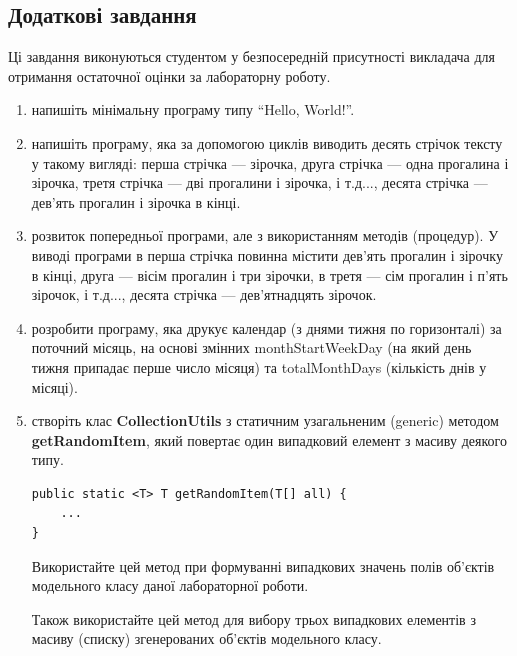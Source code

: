\subsection{Додаткові завдання}
Ці завдання виконуються студентом у безпосередній присутності викладача для отримання остаточної оцінки за лабораторну роботу.
\begin{enumerate}
\item напишіть мінімальну програму типу ``Hello, World!''.
\item напишіть програму, яка за допомогою циклів виводить десять стрічок тексту у такому вигляді: перша стрічка --- зірочка, друга стрічка --- одна прогалина і зірочка, третя стрічка --- дві прогалини і зірочка, і т.д..., десята стрічка --- дев’ять прогалин і зірочка в кінці.
\item розвиток попередньої програми, але з використанням методів (процедур). У виводі програми в перша стрічка повинна містити дев’ять прогалин і зірочку в кінці, друга --- вісім прогалин і три зірочки, в третя --- сім прогалин і п’ять зірочок, і т.д..., десята стрічка --- дев’ятнадцять зірочок.
\item розробити програму, яка друкує календар (з днями тижня по горизонталі) 
за поточний місяць, на основі змінних monthStartWeekDay (на який день тижня
припадає перше число місяця) та totalMonthDays (кількість днів у місяці).
\item створіть клас {\bf CollectionUtils} з статичним узагальненим 
(generic) методом {\bf getRandomItem}, який повертає один випадковий 
елемент з масиву деякого типу. 
\begin{lstlisting}
public static <T> T getRandomItem(T[] all) {
    ...
}
\end{lstlisting}
Використайте цей метод при формуванні випадкових значень полів об’єктів 
модельного класу даної лабораторної роботи.

Також використайте цей метод для вибору трьох випадкових елементів 
з масиву (списку) згенерованих об’єктів модельного класу.      
\end{enumerate}

